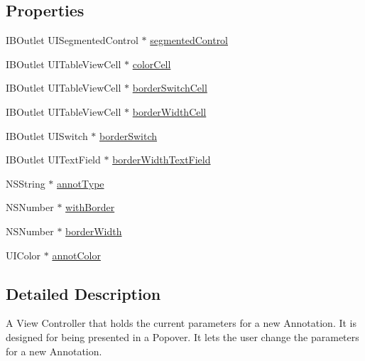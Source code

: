 \subsection*{Properties}
\begin{DoxyCompactItemize}
\item 
I\-B\-Outlet U\-I\-Segmented\-Control $\ast$ \hyperlink{interface_a_p_d_f_new_annotation_v_c_a70602e9005fc6e7982fa2ba5b4a58849}{segmented\-Control}
\item 
I\-B\-Outlet U\-I\-Table\-View\-Cell $\ast$ \hyperlink{interface_a_p_d_f_new_annotation_v_c_a8691cbdfc67a5e5cc3ba78374d52ecd7}{color\-Cell}
\item 
I\-B\-Outlet U\-I\-Table\-View\-Cell $\ast$ \hyperlink{interface_a_p_d_f_new_annotation_v_c_a4d80f8e6c0a7807ae6270cdbd6de1623}{border\-Switch\-Cell}
\item 
I\-B\-Outlet U\-I\-Table\-View\-Cell $\ast$ \hyperlink{interface_a_p_d_f_new_annotation_v_c_af31c685f4c9573a4e1149e36c8d0ece6}{border\-Width\-Cell}
\item 
I\-B\-Outlet U\-I\-Switch $\ast$ \hyperlink{interface_a_p_d_f_new_annotation_v_c_aa14411e7f7852ef499f4de84bec045e9}{border\-Switch}
\item 
I\-B\-Outlet U\-I\-Text\-Field $\ast$ \hyperlink{interface_a_p_d_f_new_annotation_v_c_ab9d6df4725587308fbe5505fe8af68a2}{border\-Width\-Text\-Field}
\item 
N\-S\-String $\ast$ \hyperlink{interface_a_p_d_f_new_annotation_v_c_a8c445f9910a0303436b5792cf3ea28b0}{annot\-Type}
\item 
N\-S\-Number $\ast$ \hyperlink{interface_a_p_d_f_new_annotation_v_c_a15b2901fa1fa2caa4e405c858f47f723}{with\-Border}
\item 
N\-S\-Number $\ast$ \hyperlink{interface_a_p_d_f_new_annotation_v_c_ad02ce736928f04d5a2d7914786c606d6}{border\-Width}
\item 
U\-I\-Color $\ast$ \hyperlink{interface_a_p_d_f_new_annotation_v_c_a2ef116193c8d363b5dfa8d8a748e753b}{annot\-Color}
\end{DoxyCompactItemize}


\subsection{Detailed Description}
A View Controller that holds the current parameters for a new Annotation. It is designed for being presented in a Popover. It lets the user change the parameters for a new Annotation. 

